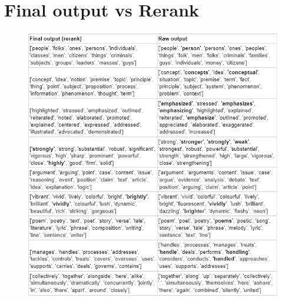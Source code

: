 \documentclass[12pt,oneside,openright,a4paper]{cpe-english-project}
\begin{document}
\section{Final output vs Rerank}
\begin{figure}[!h]\centering
\includegraphics{./img/Appendix/FinalvsRerank.png}
\end{figure}

\newpage
\end{document}
